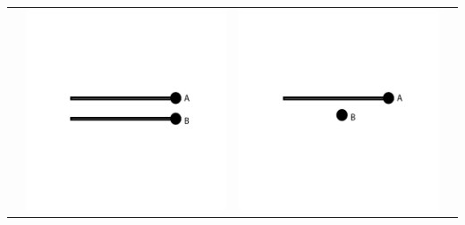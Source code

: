 \documentclass[12pt,a4paper]{report}
\begin{document}
\begin{table}[h!]
\begin{tabular}{  c  c  c  c }
\begin{minipage}{.22\textwidth}
    \end{minipage}
    & 
    \begin{minipage}{.22\textwidth}
      \includegraphics[width=\linewidth]{ELinear}
    \end{minipage}
    &
    \begin{minipage}{.22\textwidth}
      \includegraphics[width=\textwidth]{O1Linear}

\end{minipage}
\end{tabular}
\end{table}
\end{document}
